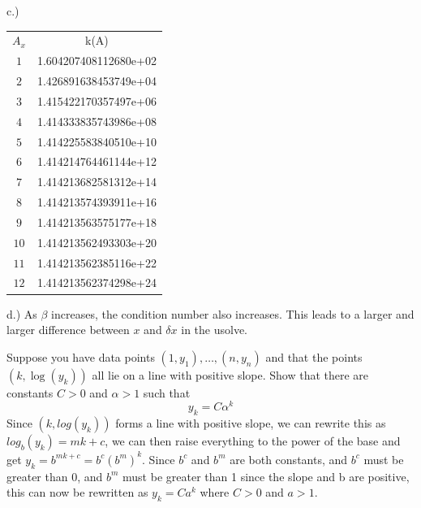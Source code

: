 \documentclass[12pt]{article}
\makeatletter
\theoremstyle{homework}
\newenvironment{exercise}[1]
{\def\@currentlabel{#1}\exercisecore}
{\endexercisecore}
\makeatother
\begin{document}
c.)
\newline
\begin{center}
\begin{tabular}{  c c }
 $A_{x}$ & k(A) \\
 $1$ & 1.604207408112680e+02\\
 $2$ & 1.426891638453749e+04 \\
 $3$ & 1.415422170357497e+06\\
 $4$ & 1.414333835743986e+08 \\
 $5$ & 1.414225583840510e+10 \\
 $6$ & 1.414214764461144e+12\\
 $7$ & 1.414213682581312e+14 \\
 $8$ & 1.414213574393911e+16\\
 $9$ & 1.414213563575177e+18\\
 $10$ & 1.414213562493303e+20\\
 $11$ & 1.414213562385116e+22\\
 $12$ & 1.414213562374298e+24
\end{tabular}
\end{center}
d.) As $\beta$ increases, the condition number also increases. This leads to a larger and larger difference between $x$ and $\delta{x}$
in the usolve.

\begin{exercise}{Supplemental 2}
Suppose you have data points $(1,y_1),\ldots, (n,y_n)$
and that the points $(k,\log(y_k))$ all lie on a line with
positive slope. Show that there are constants $C>0$ and $\alpha>1$
such that
\[
y_k = C \alpha^k
\]
\end{exercise}
Since $(k, log(y_{k}))$ forms a line with positive slope, we can rewrite this as $log_{b}(y_{k}) = mk + c$, we can 
then raise everything to the power of the base and get $y_{k} = b^{mk + c} = b^{c}(b^m)^k$. Since $b^c$ and $b^m$ are 
both constants, and $b^c$ must be greater than 0, and $b^m$ must be greater than 1 since the slope and b are positive, this can now be rewritten as
$y_{k} = Ca^k$ where $C > 0$ and $a > 1$.  
\end{document}
